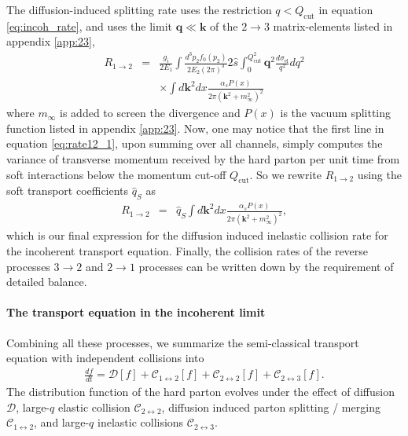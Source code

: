 \documentclass[aps, prc, reprint, amsmath, groupedaddress, nofootinbib]{revtex4-1}
\begin{document}
The diffusion-induced splitting rate uses the restriction $q<Q_{\textrm{cut}}$ in equation \ref{eq:incoh_rate}, and uses the limit $\mathbf{q} \ll \mathbf{k}$ of the $2\rightarrow 3$  matrix-elements listed in appendix \ref{app:23},
\begin{eqnarray}\nonumber
R_{1\rightarrow 2} &=& \frac{g_i}{2E_1}\int  \frac{d^3p_2f_0(p_2)}{2E_2(2\pi)^3} 2\hat{s} \int_{0}^{Q_{\textrm{cut}}^2} \mathbf{q}^2 \frac{d\sigma_{\textrm{el}}}{q^2} dq^2 
\\
&& \times \int d \mathbf{k}^2 dx \frac{\alpha_s P(x) }{2\pi (\mathbf{k}^2 + m_\infty^2)^2} \label{eq:rate12_1}
\end{eqnarray}
where $m_\infty$ is added to screen the divergence and $P(x)$ is the vacuum splitting function listed in appendix \ref{app:23}.
Now, one may notice that the first line in equation \ref{eq:rate12_1}, upon summing over all channels, simply computes the variance of transverse momentum received by the hard parton per unit time from soft interactions below the momentum cut-off $Q_{\textrm{cut}}$.
So we rewrite $R_{1\rightarrow 2}$ using the soft transport coefficients $\hat{q}_{S}$ as
\begin{eqnarray}
R_{1\rightarrow 2} &=& \hat{q}_S\int d \mathbf{k}^2 dx \frac{\alpha_s P(x) }{2\pi (\mathbf{k}^2 + m_\infty^2)^2} \label{eq:rate12_2},
\end{eqnarray}
which is our final expression for the diffusion induced inelastic collision rate for the incoherent transport equation.
Finally, the collision rates of the reverse processes $3\rightarrow 2$ and $2\rightarrow 1$ processes can be written down by the requirement of detailed balance.

\paragraph{The transport equation in the incoherent limit}
Combining all these processes, we summarize the semi-classical transport equation with independent collisions into
\begin{eqnarray}\label{eq:incoh_transport}
\frac{df}{dt} = \mathcal{D}[f] + \mathcal{C}_{1\leftrightarrow 2}[f] + \mathcal{C}_{2\leftrightarrow 2}[f] + \mathcal{C}_{2\leftrightarrow 3}[f].
\end{eqnarray}
The distribution function of the hard parton evolves under the effect of diffusion $\mathcal{D}$, large-$q$ elastic collision $\mathcal{C}_{2\leftrightarrow 2}$,  diffusion induced parton splitting / merging $\mathcal{C}_{1\leftrightarrow 2}$, and large-$q$ inelastic collisions $\mathcal{C}_{2\leftrightarrow 3}$. 
\end{document}
